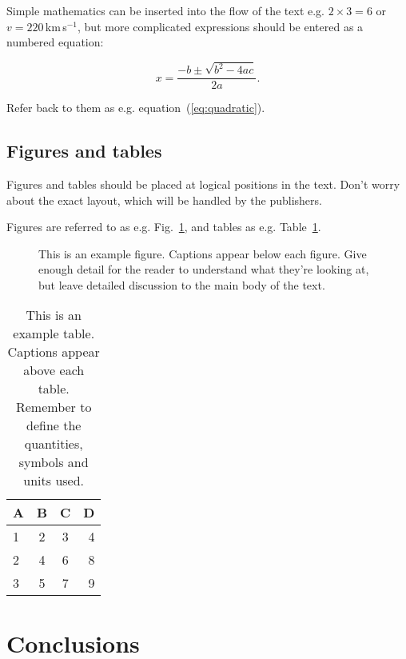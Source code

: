\documentclass[a4paper,fleqn,usenatbib]{mnras}
\begin{document}
Simple mathematics can be inserted into the flow of the text e.g. $2\times3=6$
or $v=220$\,km\,s$^{-1}$, but more complicated expressions should be entered
as a numbered equation:

\begin{equation}
    x=\frac{-b\pm\sqrt{b^2-4ac}}{2a}.
	\label{eq:quadratic}
\end{equation}

Refer back to them as e.g. equation~(\ref{eq:quadratic}).

\subsection{Figures and tables}

Figures and tables should be placed at logical positions in the text. Don't
worry about the exact layout, which will be handled by the publishers.

Figures are referred to as e.g. Fig.~\ref{fig:example_figure}, and tables as
e.g. Table~\ref{tab:example_table}.

\begin{figure}
    \caption{This is an example figure. Captions appear below each figure.
	Give enough detail for the reader to understand what they're looking at,
	but leave detailed discussion to the main body of the text.}
    \label{fig:example_figure}
\end{figure}

\begin{table}
	\centering
	\caption{This is an example table. Captions appear above each table.
	Remember to define the quantities, symbols and units used.}
	\label{tab:example_table}
	\begin{tabular}{lccr} %
		\hline
		A & B & C & D\\
		\hline
		1 & 2 & 3 & 4\\
		2 & 4 & 6 & 8\\
		3 & 5 & 7 & 9\\
		\hline
	\end{tabular}
\end{table}


\section{Conclusions}
\end{document}

